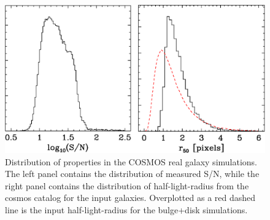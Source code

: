 \documentclass[usegraphicx,usenatbib]{mn2e}
\begin{document}
\begin{figure}
    \centering
    \includegraphics[scale=0.45]{mcal-v14s01-s2n-and-r50.eps}

    \caption{Distribution of properties in the COSMOS real galaxy simulations. The
    left panel contains the distribution of measured S/N, while the right panel contains
    the distribution of half-light-radius from the cosmos catalog for the input
    galaxies.  Overplotted as a red dashed line is the input half-light-radius
    for the bulge+disk simulations.}

\label{fig:cosmos}
\end{figure}
\end{document}

